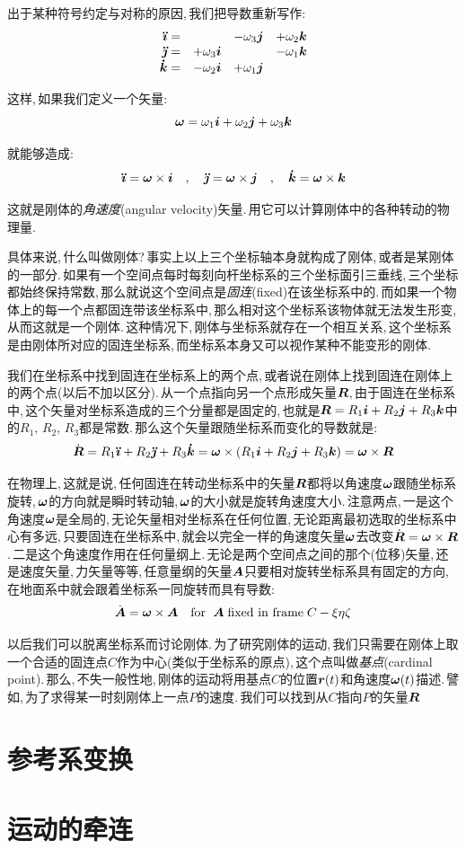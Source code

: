 出于某种符号约定与对称的原因,\,我们把导数重新写作:
\[\begin{array}{rlll}
\boldsymbol{\ddot{\imath}}=		&									 	&	-\omega_3\boldsymbol{j} 				& +\omega_2\boldsymbol{k}\\
\boldsymbol{\ddot{\jmath}}=		&	+\omega_3\boldsymbol{i} 			&									 		& -\omega_1\boldsymbol{k}\\
\boldsymbol{\dot{k}}=				&	-\omega_2\boldsymbol{i} 			&	+\omega_1\boldsymbol{j} 				& 
\end{array}\]

这样,\,如果我们定义一个矢量:
\[\boldsymbol{\omega}=\omega_1\boldsymbol{i}+\omega_2\boldsymbol{j}+\omega_3\boldsymbol{k}\]

就能够造成:
\[\boldsymbol{\ddot{\imath}}=\boldsymbol{\omega}\times \boldsymbol{i}\quad ,\quad \boldsymbol{\ddot{\jmath}}=\boldsymbol{\omega}\times \boldsymbol{j}\quad ,\quad \boldsymbol{\dot{k}}=\boldsymbol{\omega}\times \boldsymbol{k}\]

这就是刚体的\emph{角速度}(angular velocity)矢量.\,用它可以计算刚体中的各种转动的物理量.

具体来说,\,什么叫做刚体?\,事实上以上三个坐标轴本身就构成了刚体,\,或者是某刚体的一部分.\,如果有一个空间点每时每刻向杆坐标系的三个坐标面引三垂线,\,三个坐标都始终保持常数,\,那么就说这个空间点是\emph{固连}(fixed)在该坐标系中的.\,而如果一个物体上的每一个点都固连带该坐标系中,\,那么相对这个坐标系该物体就无法发生形变,\,从而这就是一个刚体.\,这种情况下,\,刚体与坐标系就存在一个相互关系,\,这个坐标系是由刚体所对应的固连坐标系,\,而坐标系本身又可以视作某种不能变形的刚体.

我们在坐标系中找到固连在坐标系上的两个点,\,或者说在刚体上找到固连在刚体上的两个点(以后不加以区分).\,从一个点指向另一个点形成矢量$\boldsymbol{R}$,\,由于固连在坐标系中,\,这个矢量对坐标系造成的三个分量都是固定的,\,也就是$\boldsymbol{R}=R_1\boldsymbol{i}+R_2\boldsymbol{j}+R_3\boldsymbol{k}$中的$R_1,\,R_2,\,R_3$都是常数.\,那么这个矢量跟随坐标系而变化的导数就是:
\[\dot{\boldsymbol{R}}=R_1\boldsymbol{\ddot{\imath}}+R_2\boldsymbol{\ddot{\jmath}}+R_3\boldsymbol{\dot{k}}=\boldsymbol{\omega}\times(R_1\boldsymbol{i}+R_2\boldsymbol{j}+R_3\boldsymbol{k})=\boldsymbol{\omega}\times\boldsymbol{R}\]

在物理上,\,这就是说,\,任何固连在转动坐标系中的矢量$\boldsymbol{R}$都将以角速度$\boldsymbol{\omega}$跟随坐标系旋转,\,$\boldsymbol{\omega}$的方向就是瞬时转动轴,\,$\boldsymbol{\omega}$的大小就是旋转角速度大小.\,注意两点,\,一是这个角速度$\boldsymbol{\omega}$是全局的,\,无论矢量相对坐标系在任何位置,\,无论距离最初选取的坐标系中心有多远,\,只要固连在坐标系中,\,就会以完全一样的角速度矢量$\boldsymbol{\omega}$去改变$\dot{\boldsymbol{R}}=\boldsymbol{\omega}\times\boldsymbol{R}$.\,二是这个角速度作用在任何量纲上.\,无论是两个空间点之间的那个(位移)矢量,\,还是速度矢量,\,力矢量等等,\,任意量纲的矢量$\boldsymbol{A}$只要相对旋转坐标系具有固定的方向,\,在地面系中就会跟着坐标系一同旋转而具有导数:
\[\dot{\boldsymbol{A}}=\boldsymbol{\omega}\times\boldsymbol{A}\quad \text{for }\; \boldsymbol{A}\;\text{fixed in frame}\; C-\xi\eta\zeta\]

以后我们可以脱离坐标系而讨论刚体.\,为了研究刚体的运动,\,我们只需要在刚体上取一个合适的固连点$C$作为中心(类似于坐标系的原点),\,这个点叫做\emph{基点}(cardinal point).\,那么,\,不失一般性地,\,刚体的运动将用基点$C$的位置$\boldsymbol{r}(t)$和角速度$\boldsymbol{\omega}(t)$描述.\,譬如,\,为了求得某一时刻刚体上一点$P$的速度.\,我们可以找到从$C$指向$P$的矢量$\boldsymbol{R}$







\section{参考系变换}

\section{运动的牵连}

